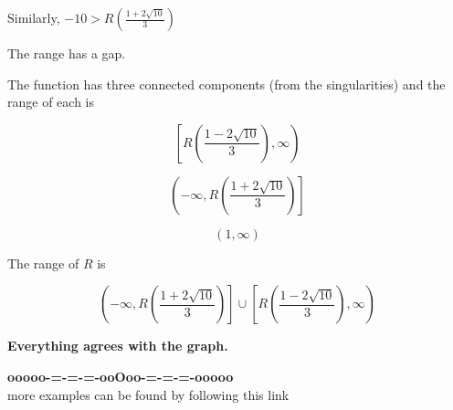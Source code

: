 \documentclass{ximera}
\begin{document}
Similarly,  $-10 > R \left( \frac{1 + 2 \sqrt{10}}{3} \right)$




The range has a gap.



The function has three connected components (from the singularities) and the range of each is 



\[
\left[ R \left( \frac{1 - 2 \sqrt{10}}{3} \right), \infty \right)
\]


\[
\left( -\infty, R \left( \frac{1 + 2 \sqrt{10}}{3} \right) \right] 
\]


\[
(1, \infty)
\]




The range of $R$ is 

\[
\left( -\infty, R \left( \frac{1 + 2 \sqrt{10}}{3} \right) \right] \cup \left[ R \left( \frac{1 - 2 \sqrt{10}}{3} \right), \infty \right)
\]








\begin{center}

\textbf{\textcolor{red!70!black}{Everything agrees with the graph.}}


\end{center}



\begin{onlineOnly}
\begin{center}
\textbf{\textcolor{green!50!black}{ooooo-=-=-=-ooOoo-=-=-=-ooooo}} \\

more examples can be found by following this link\\ 

\end{center}
\end{onlineOnly}
\end{document}
